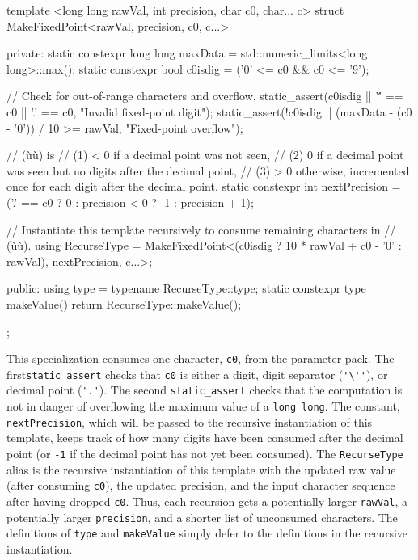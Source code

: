 \begin{emcppslisting}
template <long long rawVal, int precision, char c0, char... c>
struct MakeFixedPoint<rawVal, precision, c0, c...>
{
private:
    static constexpr long long maxData = std::numeric_limits<long long>::max();
    static constexpr bool      c0isdig = ('0' <= c0 && c0 <= '9');

    // Check for out-of-range characters and overflow.
    static_assert(c0isdig || '\'' == c0 || '.' == c0,
                  "Invalid fixed-point digit");
    static_assert(!c0isdig || (maxData - (c0 - '0')) / 10 >= rawVal,
                  "Fixed-point overflow");

    // (ù{}ù) is
    // (1) < 0 if a decimal point was not seen,
    // (2) 0   if a decimal point was seen but no digits after the decimal point,
    // (3) > 0 otherwise, incremented once for each digit after the decimal point.
    static constexpr int nextPrecision = ('.' == c0     ?  0 :
                                          precision < 0 ? -1 :
                                          precision + 1);

    // Instantiate this template recursively to consume remaining characters in
    // (ù{}ù).
    using RecurseType = MakeFixedPoint<(c0isdig ? 10 * rawVal + c0 - '0' :
                                        rawVal), nextPrecision, c...>;

public:
    using                 type = typename RecurseType::type;
    static constexpr type makeValue() { return RecurseType::makeValue(); }
};
\end{emcppslisting}
    
\noindent This specialization consumes one character, \lstinline!c0!, from the
parameter pack. The first\linebreak[4]%
\lstinline!static_assert! checks that
\lstinline!c0! is either a digit, digit separator
(\lstinline!'\''!), 
or decimal point (\lstinline!'.'!). The second
\lstinline!static_assert! checks that the computation is not in danger of
overflowing the maximum value of a \lstinline!long!~\lstinline!long!. The
constant, \lstinline!nextPrecision!, which will be passed to the recursive
instantiation of this template, keeps track of how many digits have been
consumed after the decimal point (or \lstinline!-1! if the decimal point has not yet
been consumed). The \lstinline!RecurseType! alias is the recursive
instantiation of this template with the updated raw value (after
consuming \lstinline!c0!), the updated precision, and the input character
sequence after having dropped \lstinline!c0!. Thus, each recursion gets a
potentially larger \lstinline!rawVal!, a potentially larger
\lstinline!precision!, and a shorter list of unconsumed characters. The
definitions of \lstinline!type! and \lstinline!makeValue! simply defer to the
definitions in the recursive instantiation.

